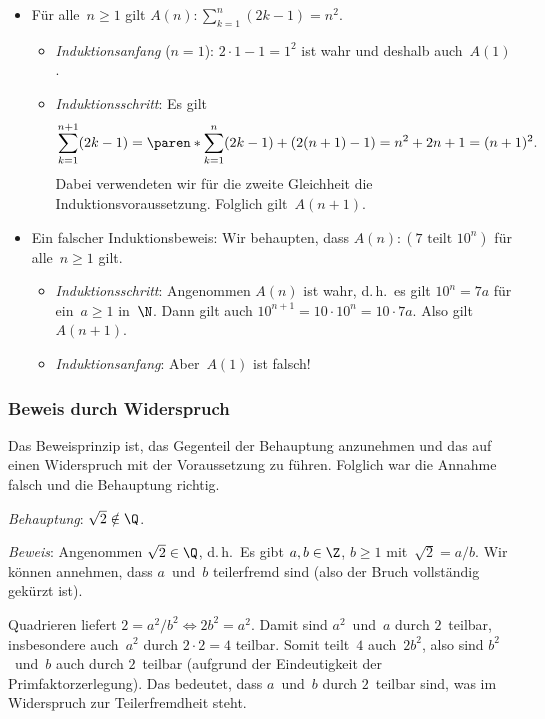 \documentclass[a4paper]{article}
\begin{document}
\begin{example}\leavevmode
    \begin{itemize}
        \item Für alle~$n \geq 1$ gilt $A(n)\colon \sum_{k=1}^n (2k-1) = n^2$.
              \begin{itemize}
                  \item \emph{Induktionsanfang} ($n = 1$): $2 \cdot 1 - 1 = 1^2$ ist wahr und deshalb auch~$A(1)$.
                  \item \emph{Induktionsschritt}: Es gilt
                        \begin{equation*}
                            \sum_{k=1}^{n+1} (2k-1) = \paren*{\sum_{k=1}^n (2k-1)} + (2(n+1) - 1) = n^2 + 2n + 1 = (n+1)^2.
                        \end{equation*}
                        Dabei verwendeten wir für die zweite Gleichheit die Induktionsvoraussetzung. Folglich gilt~$A(n+1)$.
              \end{itemize}
        \item Ein falscher Induktionsbeweis: Wir behaupten, dass $A(n)\colon (7 \text{ teilt } 10^n)$ für alle~$n \geq 1$ gilt.
              \begin{itemize}
                  \item \emph{Induktionsschritt}: Angenommen $A(n)$ ist wahr, d.\,h.\ es gilt $10^n = 7a$ für ein~$a \geq 1$ in~$\N$. Dann gilt auch $10^{n+1} = 10 \cdot 10^n = 10 \cdot 7a$. Also gilt~$A(n+1)$.
                  \item \emph{Induktionsanfang}: Aber~$A(1)$ ist falsch!
              \end{itemize}
    \end{itemize}
\end{example}

\subsubsection{Beweis durch Widerspruch}

Das Beweisprinzip ist, das Gegenteil der Behauptung anzunehmen und das auf einen Widerspruch mit der Voraussetzung zu führen. Folglich war die Annahme falsch und die Behauptung richtig.

\begin{example}
    \emph{Behauptung}: $\sqrt{2} \notin \Q$.

    \emph{Beweis}: Angenommen $\sqrt{2} \in \Q$, d.\,h.\ Es gibt $a, b \in \Z$, $b \geq 1$ mit~$\sqrt{2} = a/b$. Wir können annehmen, dass $a$~und~$b$ teilerfremd sind (also der Bruch vollständig gekürzt ist).

    Quadrieren liefert $2 = a^2/b^2 \iff 2b^2 = a^2$. Damit sind $a^2$~und~$a$ durch $2$~teilbar, insbesondere auch~$a^2$ durch $2\cdot2 = 4$ teilbar. Somit teilt~$4$ auch~$2b^2$, also sind $b^2$~und~$b$ auch durch $2$~teilbar (aufgrund der Eindeutigkeit der Primfaktorzerlegung). Das bedeutet, dass $a$~und~$b$ durch $2$~teilbar sind, was im Widerspruch zur Teilerfremdheit steht.
\end{example}
\end{document}
